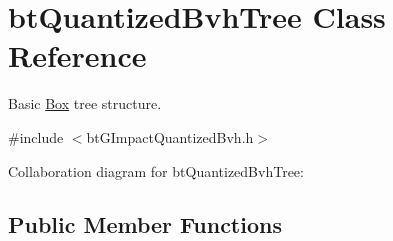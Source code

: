 \hypertarget{classbt_quantized_bvh_tree}{\section{bt\+Quantized\+Bvh\+Tree Class Reference}
\label{classbt_quantized_bvh_tree}
}


Basic \hyperlink{class_box}{Box} tree structure.  




{\ttfamily \#include $<$bt\+G\+Impact\+Quantized\+Bvh.\+h$>$}



Collaboration diagram for bt\+Quantized\+Bvh\+Tree\+:
\subsection*{Public Member Functions}
{\bf }\par

